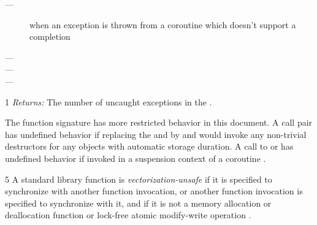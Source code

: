 \begin{description}
    \item[---] when an exception is thrown from a
               coroutine  which doesn’t support
               a 
               completion
    \item[---] 
    \item[---] 
    \item[---] 
\end{description}


1 \emph{Returns:} The number of uncaught exceptions  in the
.


The function signature  has more
restricted behavior in this document. A  call pair has
undefined behavior if replacing the  and 
by  and  would invoke any non-trivial destructors for
any objects with automatic storage duration.
A call to  or  has undefined behavior if invoked in a
suspension context of a coroutine .


5 A standard library function is \emph{vectorization-unsafe} if it is specified to
synchronize with another function invocation, or another function invocation
is specified to synchronize with it, and if it is not a memory allocation or
deallocation function or lock-free atomic modify-write operation .
\\

